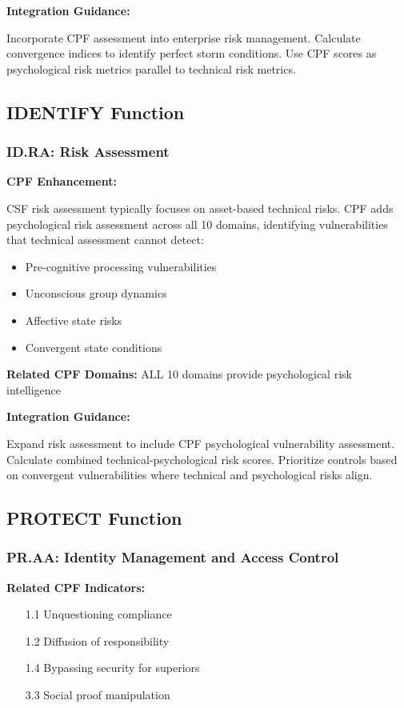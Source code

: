 \documentclass[11pt,a4paper]{article}
\begin{document}
\textbf{Integration Guidance:}

Incorporate CPF assessment into enterprise risk management. Calculate convergence indices to identify perfect storm conditions. Use CPF scores as psychological risk metrics parallel to technical risk metrics.

\subsection{IDENTIFY Function}

\subsubsection{ID.RA: Risk Assessment}

\textbf{CPF Enhancement:}

CSF risk assessment typically focuses on asset-based technical risks. CPF adds psychological risk assessment across all 10 domains, identifying vulnerabilities that technical assessment cannot detect:

\begin{itemize}
\item Pre-cognitive processing vulnerabilities
\item Unconscious group dynamics
\item Affective state risks
\item Convergent state conditions
\end{itemize}

\textbf{Related CPF Domains:} ALL 10 domains provide psychological risk intelligence

\textbf{Integration Guidance:}

Expand risk assessment to include CPF psychological vulnerability assessment. Calculate combined technical-psychological risk scores. Prioritize controls based on convergent vulnerabilities where technical and psychological risks align.

\subsection{PROTECT Function}

\subsubsection{PR.AA: Identity Management and Access Control}

\textbf{Related CPF Indicators:}
\begin{itemize}
\item [1.1] Unquestioning compliance
\item [1.2] Diffusion of responsibility
\item [1.4] Bypassing security for superiors
\item [3.3] Social proof manipulation
\end{itemize}
\end{document}
